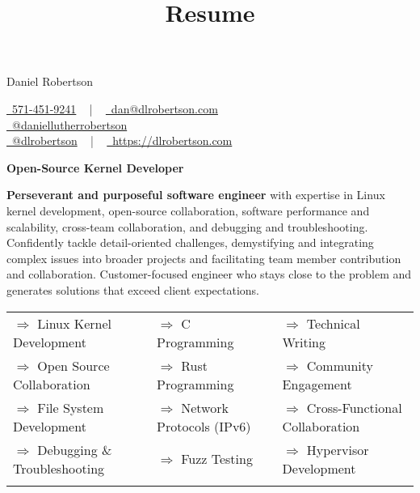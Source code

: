 \documentclass[a4paper,skipsamekey,11pt,english]{curve}
\title{Resume}
\newcommand{\allTheInfo}[3]{
  \begin{center}
    {\Huge\color{red} #1} \hfill {
      \begin{minipage}{3in}
        #2
      \end{minipage}
    }
    \vspace{10pt}
    \begin{tcolorbox}[
      sharp corners,
      boxrule=0mm,
      enhanced,
      borderline north={1pt}{0pt}{blue},
      borderline south={1pt}{0pt}{blue},
      borderline west={0pt}{0pt}{base1!10},
      borderline east={0pt}{0pt}{base1!10},
    ]
      \begin{center}
        \vspace{-5pt}
        \Large{#3}
        \vspace{-5pt}
      \end{center}
    \end{tcolorbox}
  \end{center}
}
\newcommand{\makeSkillRow}[3]{
  {$\Rightarrow$#1} & {$\Rightarrow$#2} & {$\Rightarrow$#3}\\
}
\begin{document}
  \allTheInfo{
    Daniel Robertson
  }{
    \href{tel:5714519241}{
      \raisebox{-0.05\height} \faPhone\ 571-451-9241} ~ | ~
    \href{mailto:dan@dlrobertson.com}{
      \raisebox{-0.15\height} \faEnvelope\ dan@dlrobertson.com}\\
    \href{www.linkedin.com/in/daniellutherrobertson/ }{
      \raisebox{-0.15\height} \faLinkedin\ @daniellutherrobertson }\\
    \href{https://github.com/dlrobertson}{
      \raisebox{-0.15\height} \faGithub\ @dlrobertson} ~ | ~
    \href{https://dlrobertson.com}{
      \raisebox{-0.15\height} \faGlobe\ https://dlrobertson.com}
  }{
    \color{base03}\textbf{Open-Source Kernel Developer}
  }

  \textbf{Perseverant and purposeful software engineer} with expertise in Linux kernel
  development, open-source collaboration, software performance and scalability,
  cross-team collaboration, and debugging and troubleshooting. Confidently
  tackle detail-oriented challenges, demystifying and integrating complex
  issues into broader projects and facilitating team member contribution and
  collaboration. Customer-focused engineer who stays close to the problem and
  generates solutions that exceed client expectations.
  \begin{center}
    \setlength{\tabcolsep}{1em}
    \begin{tabular}{ l l l }
      \makeSkillRow{
        Linux Kernel Development
      }{
        C Programming
      }{
        Technical Writing
      }
      \makeSkillRow{
        Open Source Collaboration
      }{
        Rust Programming
      }{
        Community Engagement
      }
      \makeSkillRow{
        File System Development
      }{
        Network Protocols (IPv6)
      }{
        Cross-Functional Collaboration
      }
      \makeSkillRow{
        Debugging \& Troubleshooting
      }{
        Fuzz Testing
      }{
        Hypervisor Development
      }\\
    \end{tabular}
  \end{center}
\end{document}
